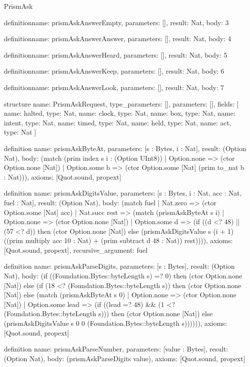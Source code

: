 \begin{lexlean}{PrismAsk}
\begin{semanticmodule}
definition{name: prismAskAnswerEmpty, parameters: [], result: Nat, body: 3}

definition{name: prismAskAnswerAnswer, parameters: [], result: Nat, body: 4}

definition{name: prismAskAnswerHeard, parameters: [], result: Nat, body: 5}

definition{name: prismAskAnswerKeep, parameters: [], result: Nat, body: 6}

definition{name: prismAskAnswerLook, parameters: [], result: Nat, body: 7}

structure{
  name: PrismAskRequest,
  type_parameters: [],
  parameters: [],
  fields: [
    {name: halted, type: Nat},
    {name: clock, type: Nat},
    {name: box, type: Nat},
    {name: intent, type: Nat},
    {name: timed, type: Nat},
    {name: held, type: Nat},
    {name: act, type: Nat}
  ]
}

definition{
  name: prismAskByteAt,
  parameters: [s : Bytes, i : Nat],
  result: (Option Nat),
  body: (match (prim index s i : (Option UInt8))
    | Option.none => (ctor Option.none [Nat])
    | Option.some b => (ctor Option.some [Nat] (prim to_nat b : Nat))),
  axioms: [Quot.sound, propext]
}

definition{
  name: prismAskDigitsValue,
  parameters: [s : Bytes, i : Nat, acc : Nat, fuel : Nat],
  result: (Option Nat),
  body: (match fuel
    | Nat.zero => (ctor Option.some [Nat] acc)
    | Nat.succ rest => (match (prismAskByteAt s i)
      | Option.none => (ctor Option.none [Nat])
      | Option.some d => (if ((d <? 48) || (57 <? d)) then (ctor Option.none [Nat]) else (prismAskDigitsValue s (i + 1) ((prim multiply acc 10 : Nat) + (prim subtract d 48 : Nat)) rest)))),
  axioms: [Quot.sound, propext],
  recursive_argument: fuel
}

definition{
  name: prismAskParseDigits,
  parameters: [s : Bytes],
  result: (Option Nat),
  body: (if ((Foundation.Bytes::byteLength s) =? 0) then (ctor Option.none [Nat]) else (if (18 <? (Foundation.Bytes::byteLength s)) then (ctor Option.none [Nat]) else (match (prismAskByteAt s 0)
    | Option.none => (ctor Option.none [Nat])
    | Option.some lead => (if ((lead =? 48) && (1 <? (Foundation.Bytes::byteLength s))) then (ctor Option.none [Nat]) else (prismAskDigitsValue s 0 0 (Foundation.Bytes::byteLength s)))))),
  axioms: [Quot.sound, propext]
}

definition{
  name: prismAskParseNumber,
  parameters: [value : Bytes],
  result: (Option Nat),
  body: (prismAskParseDigits value),
  axioms: [Quot.sound, propext]
}


\end{semanticmodule}
\end{lexlean}
